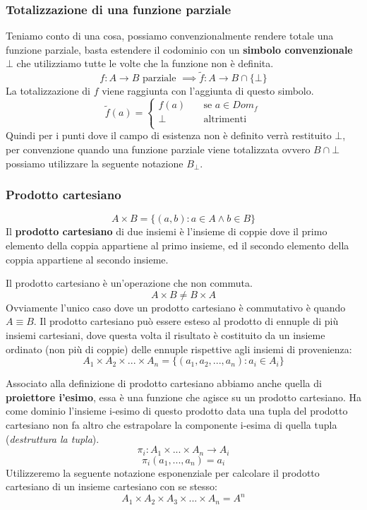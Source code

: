\documentclass{article}
\begin{document}
\subsubsection{Totalizzazione di una funzione parziale}
Teniamo conto di una cosa, possiamo convenzionalmente rendere totale una funzione parziale, basta estendere
il codominio con un \textbf{simbolo convenzionale} $\bot$ che utilizziamo
tutte le volte che la funzione non è definita.
$$f:A\rightarrow B\text{ parziale } \implies \widetilde{f}:A\rightarrow B\cap\{\bot\}$$
La totalizzazione di $f$ viene raggiunta con l'aggiunta di questo simbolo.
\[
    \widetilde{f}(a) =
    \begin{cases}
        f(a) & \quad\text{se }a\in Dom_f \\
        \bot & \quad\text{altrimenti}    \\
    \end{cases}
\]
Quindi per i punti dove il campo di esistenza non è definito verrà restituito $\bot$, per convenzione
quando una funzione parziale viene totalizzata ovvero $B\cap\bot$ possiamo utilizzare la seguente
notazione $B_{\bot}$.

\subsubsection{Prodotto cartesiano}
$$A\times B=\{(a,b):a\in A \land b\in B\}$$
Il \textbf{prodotto cartesiano} di due insiemi è l'insieme di coppie dove il primo elemento della coppia appartiene al primo insieme, ed il secondo elemento della coppia appartiene al secondo insieme.

Il prodotto cartesiano è un'operazione che non commuta.
$$A\times B \neq B\times A$$
Ovviamente l'unico caso dove un prodotto cartesiano è commutativo è quando $A\equiv B$.
Il prodotto cartesiano può essere esteso al prodotto di ennuple di più insiemi cartesiani,
dove questa volta il risultato è costituito da un insieme ordinato (non più di coppie) delle ennuple
rispettive agli insiemi di provenienza:
$$A_1\times A_2 \times ... \times A_n=\{(a_1,a_2,...,a_n):a_i\in A_i\}$$

Associato alla definizione di prodotto cartesiano abbiamo anche quella di \textbf{proiettore i'esimo},
essa è una funzione che agisce su un prodotto cartesiano. Ha come dominio l'insieme i-esimo di questo prodotto data una tupla del prodotto cartesiano non fa altro che estrapolare la componente i-esima di quella tupla (\textit{destruttura la tupla}).
$$\pi_i:A_1\times ...\times A_n\rightarrow A_i$$
$$\pi_i(a_1,...,a_n)=a_i$$
Utilizzeremo la seguente notazione esponenziale per calcolare il prodotto cartesiano di un insieme cartesiano
con se stesso:
$$A_1\times A_2\times A_3 \times ... \times A_n = A^n$$
\end{document}
